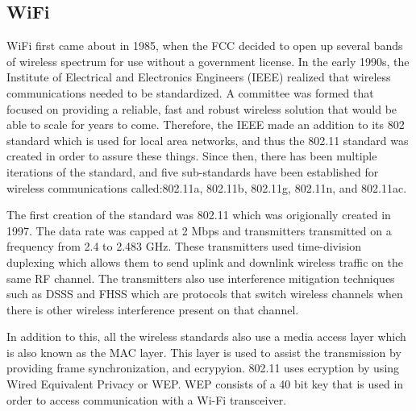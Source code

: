 \subsection{WiFi}
WiFi first came about in 1985, when the FCC decided to open up several bands of wireless spectrum for use without a government license. In the early 1990s, the Institute of Electrical and Electronics Engineers (IEEE) realized that wireless communications needed to be standardized. A committee was formed that focused on providing a reliable, fast and robust wireless solution that would be able to scale for years to come. Therefore, the IEEE made an addition to its 802 standard which is used for local area networks, and thus the 802.11 standard was created in order to assure these things. Since then, there has been multiple iterations of the standard, and five sub-standards have been established for wireless communications called:802.11a, 802.11b, 802.11g, 802.11n, and 802.11ac. \cite{bergieee}

The first creation of the standard was 802.11 which was origionally created in 1997. The data rate was capped at 2 Mbps and transmitters transmitted on a frequency from 2.4 to 2.483 GHz. These transmitters used time-division duplexing which allows them to send uplink and downlink wireless traffic on the same RF channel. The transmitters also use interference mitigation techniques such as DSSS and FHSS which are protocols that switch wireless channels when there is other wireless interference present on that channel.

In addition to this, all the wireless standards also use a media access layer which is also known as the MAC layer.  This layer is used to assist the transmission by providing frame synchronization, and ecrypyion.  802.11 uses ecryption by using Wired Equivalent Privacy or WEP.  WEP consists of a 40 bit key that is used in order to access communication with a Wi-Fi transceiver.

